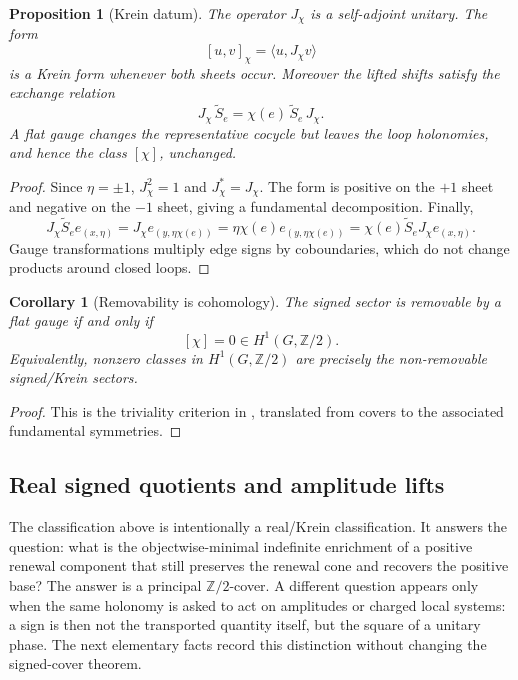 \documentclass[11pt]{article}
\newtheorem{proposition}[theorem]{Proposition}
\newtheorem{corollary}[theorem]{Corollary}
\theoremstyle{definition}
\theoremstyle{remark}
\newcommand{\Z}{\mathbb{Z}}
\begin{document}
\begin{proposition}[Krein datum]
\label{prop:krein-datum}
The operator $J_\chi$ is a self-adjoint unitary.  The form
\[
  [u,v]_\chi=\langle u,J_\chi v\rangle
\]
is a Krein form whenever both sheets occur.  Moreover the lifted shifts satisfy
the exchange relation
\[
  J_\chi\,\widetilde S_e=\chi(e)\,\widetilde S_e\,J_\chi .
\]
A flat gauge changes the representative cocycle but leaves the loop holonomies,
and hence the class $[\chi]$, unchanged.
\end{proposition}

\begin{proof}
Since $\eta=\pm1$, $J_\chi^2=1$ and $J_\chi^*=J_\chi$.  The form is positive
on the $+1$ sheet and negative on the $-1$ sheet, giving a fundamental
decomposition.  Finally,
\[
  J_\chi\widetilde S_e e_{(x,\eta)}
  =J_\chi e_{(y,\eta\chi(e))}
  =\eta\chi(e)e_{(y,\eta\chi(e))}
  =\chi(e)\widetilde S_eJ_\chi e_{(x,\eta)} .
\]
Gauge transformations multiply edge signs by coboundaries, which do not change
products around closed loops.
\end{proof}

\begin{corollary}[Removability is cohomology]
\label{cor:removability}
The signed sector is removable by a flat gauge if and only if
\[
  [\chi]=0\in H^1(G,\Z/2).
\]
Equivalently, nonzero classes in $H^1(G,\Z/2)$ are precisely the
non-removable signed/Krein sectors.
\end{corollary}

\begin{proof}
This is the triviality criterion in , translated from covers
to the associated fundamental symmetries.
\end{proof}

\subsection{Real signed quotients and amplitude lifts}
\label{subsec:real-amplitude-lifts}

The classification above is intentionally a real/Krein classification.  It
answers the question: what is the objectwise-minimal indefinite enrichment of a
positive renewal component that still preserves the renewal cone and recovers the
positive base?  The answer is a principal \(\Z/2\)-cover.  A different question
appears only when the same holonomy is asked to act on amplitudes or charged
local systems: a sign is then not the transported quantity itself, but the square
of a unitary phase.  The next elementary facts record this distinction without
changing the signed-cover theorem.
\end{document}
